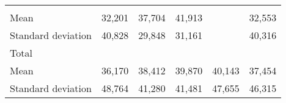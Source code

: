 \begin{tabular}{llllll}
  \multicolumn{1}{r}{} &
  \multicolumn{1}{r}{} &
  \multicolumn{1}{r}{} &
  \multicolumn{1}{r}{} \\
\multicolumn{1}{l}{\hspace{4em}Mean} &
  \multicolumn{1}{|r}{32,201} &
  \multicolumn{1}{r}{37,704} &
  \multicolumn{1}{r}{41,913} &
  \multicolumn{1}{r}{} &
  \multicolumn{1}{r}{32,553} \\
\multicolumn{1}{l}{\hspace{4em}Standard deviation} &
  \multicolumn{1}{|r}{40,828} &
  \multicolumn{1}{r}{29,848} &
  \multicolumn{1}{r}{31,161} &
  \multicolumn{1}{r}{} &
  \multicolumn{1}{r}{40,316} \\
\multicolumn{1}{l}{\hspace{3em}Total} &
  \multicolumn{1}{|r}{} &
  \multicolumn{1}{r}{} &
  \multicolumn{1}{r}{} &
  \multicolumn{1}{r}{} &
  \multicolumn{1}{r}{} \\
\multicolumn{1}{l}{\hspace{4em}Mean} &
  \multicolumn{1}{|r}{36,170} &
  \multicolumn{1}{r}{38,412} &
  \multicolumn{1}{r}{39,870} &
  \multicolumn{1}{r}{40,143} &
  \multicolumn{1}{r}{37,454} \\
\multicolumn{1}{l}{\hspace{4em}Standard deviation} &
  \multicolumn{1}{|r}{48,764} &
  \multicolumn{1}{r}{41,280} &
  \multicolumn{1}{r}{41,481} &
  \multicolumn{1}{r}{47,655} &
  \multicolumn{1}{r}{46,315} \\
\cline{1-6}
\end{tabular}

